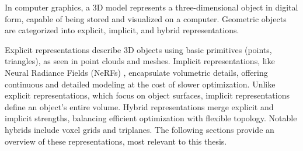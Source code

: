 In computer graphics, a 3D model represents a three-dimensional object in digital form, capable of being stored and visualized on a computer. Geometric objects are categorized into explicit, implicit, and hybrid representations.

Explicit representations describe 3D objects using basic primitives (points, triangles), as seen in point clouds and meshes. Implicit representations, like Neural Radiance Fields (NeRFs) \citep{Mildenhall.2020}, encapsulate volumetric details, offering continuous and detailed modeling at the cost of slower optimization. Unlike explicit representations, which focus on object surfaces, implicit representations define an object's entire volume. Hybrid representations merge explicit and implicit strengths, balancing efficient optimization with flexible topology. Notable hybrids include voxel grids and triplanes. The following sections provide an overview of these representations, most relevant to this thesis.

